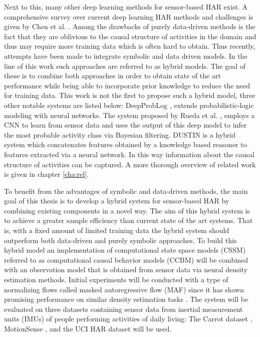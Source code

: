 \documentclass[11pt,titlepage,oneside,openany]{book}
\begin{document}
Next to this, many other deep learning methods for sensor-based HAR exist. A comprehensive survey over current deep learning HAR methods and challenges is given by Chen et al. \cite{chen_deep_2022}. Among the drawbacks of purely data-driven methods is the fact that they are oblivious to the causal structure of activities in the domain and thus may require more training data which is often hard to obtain. Thus recently, attempts have been made to integrate symbolic and data driven models. In the line of this work such approaches are referred to as hybrid models. The goal of these is to combine both approaches in order to obtain state of the art performance while being able to incorporate prior knowledge to reduce the need for training data. This work is not the first to propose such a hybrid model, three other notable systems are listed below: DeepProbLog \cite{manhaeve_deepproblog_2018}, extends probabilistic-logic modeling with neural networks. The system proposed by Rueda et al. \cite{rueda_combining_2019}, employs a CNN to learn from sensor data and uses the output of this deep model to infer the most probable activity class via Bayesian filtering. DUSTIN \cite{arrotta_knowledge_2022} is a hybrid system which concatenates features obtained by a knowledge based reasoner to features extracted via a neural network. In this way information about the causal structure of activities can be captured. A more thorough overview of related work is given in chapter \ref{cha:rel}.

To benefit from the advantages of symbolic and data-driven methods, the main goal of this thesis is to develop a hybrid system for sensor-based HAR by combining existing components in a novel way. The aim of this hybrid system is to achieve a greater sample efficiency than current state of the art systems. That is, with a fixed amount of limited training data the hybrid system should outperform both data-driven and purely symbolic approaches. To build this hybrid model an implementation of computational state space models (CSSM) \cite{kruger_computational_2014} referred to as computational causal behavior models (CCBM) will be combined with an observation model that is obtained from sensor data via neural density estimation methods. Initial experiments will be conducted with a type of normalizing flows called masked autoregressive flow (MAF) \cite{papamakarios_masked_2017} since it has shown promising performance on similar density estimation tasks \cite{kobyzev_normalizing_2021}. The system will be evaluated on three datasets containing sensor data from inertial measurement units (IMUs) of people performing activities of daily living: The Carrot dataset \cite{kruger_recognising_2011}, MotionSense \cite{malekzadeh_mobile_2019}, and the UCI HAR dataset \cite{anguita_public_2013} will be used.
\end{document}
